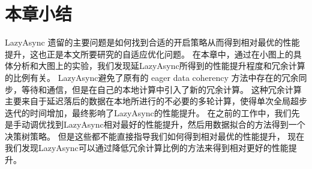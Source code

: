 
\section{本章小结}
LazyAsync 遗留的主要问题是如何找到合适的开启策略从而得到相对最优的性能提升，这也正是本文所要研究的自适应优化问题。
在本章中，通过在小图上的具体分析和大图上的实验，我们发现延LazyAsync所得到的性能提升程度和冗余计算的比例有关。
LazyAsync避免了原有的 eager data coherency 方法中存在的冗余同步，等待和通信，但是在自己的本地计算中引入了新的冗余计算。
这种冗余计算主要来自于延迟落后的数据在本地所进行的不必要的多轮计算，使得单次全局超步迭代的时间增加，最终影响了LazyAsync的性能提升。
在之前的工作中，我们先是手动调优找到LazyAsync相对最好的性能提升，然后用数据拟合的方法得到一个决策树策略。
但是这些都不能直接指导我们如何得到相对最优的性能提升，
现在我们发现LazyAsync可以通过降低冗余计算比例的方法来得到相对更好的性能提升。
